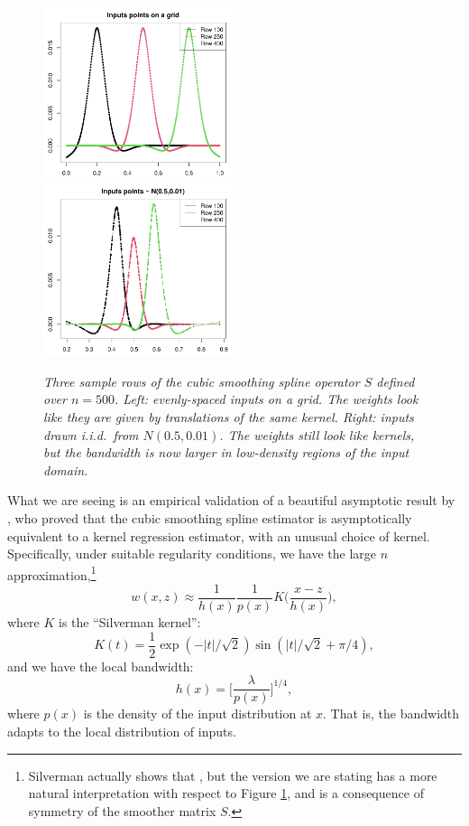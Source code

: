 \documentclass{article}
\begin{document}
\begin{figure}[tb]
\centering
\includegraphics[width=0.495\textwidth]{ss_kernel1.pdf}
\includegraphics[width=0.495\textwidth]{ss_kernel2.pdf}
\caption{\it Three sample rows of the cubic smoothing spline operator $S$
  defined over $n=500$. Left: evenly-spaced inputs on a grid. The weights look
  like they are given by translations of the same kernel. Right: inputs drawn
  i.i.d.\ from $N(0.5, 0.01)$. The weights still look like kernels, but the
  bandwidth is now larger in low-density regions of the input domain.}     
\label{fig:ss_kernel}
\end{figure}

What we are seeing is an empirical validation of a beautiful asymptotic result
by \citet{silverman1984spline}, who proved that the cubic smoothing spline
estimator is asymptotically equivalent to a kernel regression estimator, with an 
unusual choice of kernel. Specifically, under suitable regularity conditions, we
have the large $n$ approximation,\footnote{Silverman actually shows that
  ,
  but the version we are stating has a more natural interpretation with respect
  to Figure \ref{fig:ss_kernel}, and is a consequence of symmetry of the
  smoother matrix $S$.}  
\[
w(x, z) \approx \frac{1}{h(x)} \frac{1}{p(x)} K\bigg( \frac{x-z}{h(x)} \bigg), 
\]
where $K$ is the ``Silverman kernel'': 
\[
K(t) = \frac{1}{2} \exp(-|t|/\sqrt{2}) \sin(|t|/\sqrt{2} + \pi/4), 
\]
and we have the local bandwidth: 
\[
h(x) = \bigg[ \frac{\lambda}{p(x)} \bigg]^{1/4},
\]
where $p(x)$ is the density of the input distribution at $x$. That is, the
bandwidth adapts to the local distribution of inputs. 
\end{document}
